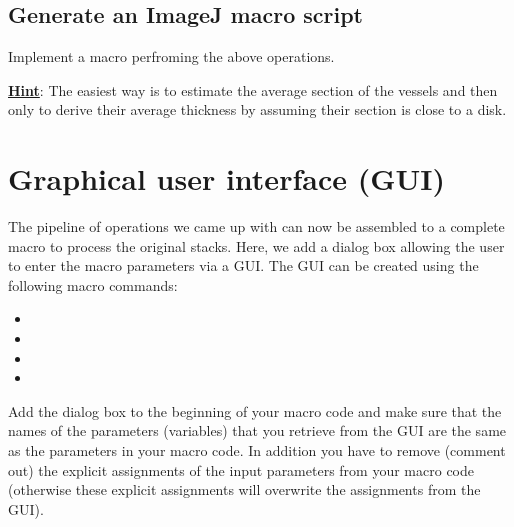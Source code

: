 \subsection{Generate an ImageJ macro script}

Implement a macro perfroming the above operations.

\textbf{\underline{Hint}}: The easiest way is to estimate the average section of the vessels and then only to derive their average thickness by assuming their section is close to a disk.
%




\section{Graphical user interface (GUI)}
\label{sec:mod8lab1}
%
The pipeline of operations we came up with can now be assembled to a complete macro to process the original stacks. Here, we add a dialog box allowing the user to enter the macro parameters via a GUI. The GUI can be created using the following macro commands:
\begin{itemize}
\item {}
\item {}
\item {}
\item {}
\end{itemize}
Add the dialog box to the beginning of your macro code and make sure that the names of the parameters (variables) that you retrieve from the GUI are the same as the parameters in your macro code. In addition you have to remove (comment out) the explicit assignments of the input parameters from your macro code (otherwise these explicit assignments will overwrite the assignments from the GUI).   



